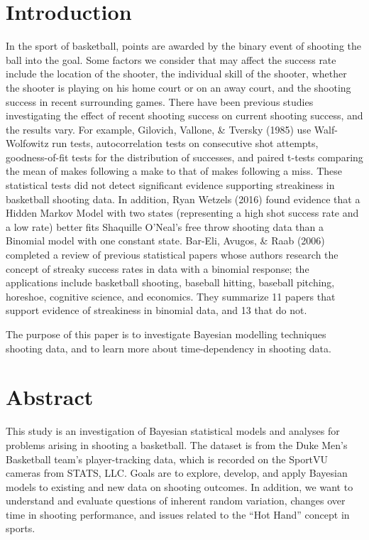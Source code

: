\documentclass[12pt,twoside]{dukestatscithesis}
\theoremstyle{definition}
\theoremstyle{definition}
\theoremstyle{definition}
\theoremstyle{remark}
\begin{document}
\chapter*{Introduction}\label{introduction}

In the sport of basketball, points are awarded by the binary event of
shooting the ball into the goal. Some factors we consider that may
affect the success rate include the location of the shooter, the
individual skill of the shooter, whether the shooter is playing on his
home court or on an away court, and the shooting success in recent
surrounding games. There have been previous studies investigating the
effect of recent shooting success on current shooting success, and the
results vary. For example, Gilovich, Vallone, \& Tversky (1985) use
Walf-Wolfowitz run tests, autocorrelation tests on consecutive shot
attempts, goodness-of-fit tests for the distribution of successes, and
paired t-tests comparing the mean of makes following a make to that of
makes following a miss. These statistical tests did not detect
significant evidence supporting streakiness in basketball shooting data.
In addition, Ryan Wetzels (2016) found evidence that a Hidden Markov
Model with two states (representing a high shot success rate and a low
rate) better fits Shaquille O'Neal's free throw shooting data than a
Binomial model with one constant state. Bar-Eli, Avugos, \& Raab (2006)
completed a review of previous statistical papers whose authors research
the concept of streaky success rates in data with a binomial response;
the applications include basketball shooting, baseball hitting, baseball
pitching, horeshoe, cognitive science, and economics. They summarize 11
papers that support evidence of streakiness in binomial data, and 13
that do not.

The purpose of this paper is to investigate Bayesian modelling
techniques shooting data, and to learn more about time-dependency in
shooting data.

\chapter{Abstract}\label{abstract}

This study is an investigation of Bayesian statistical models and
analyses for problems arising in shooting a basketball. The dataset is
from the Duke Men's Basketball team's player-tracking data, which is
recorded on the SportVU cameras from STATS, LLC. Goals are to explore,
develop, and apply Bayesian models to existing and new data on shooting
outcomes. In addition, we want to understand and evaluate questions of
inherent random variation, changes over time in shooting performance,
and issues related to the ``Hot Hand'' concept in sports.
\end{document}
